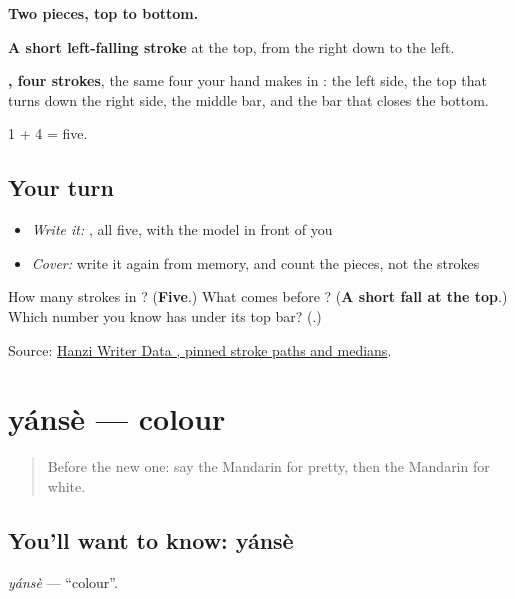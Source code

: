 \begin{quote}
\end{quote}

\textbf{Two pieces, top to bottom.}

\textbf{A short left-falling stroke} at the top, from the right down to the left.

\textbf{, four strokes}, the same four your hand makes in : the left side, the top that turns down the right side, the middle bar, and the bar that closes the bottom.

1 + 4 = five.

\subsection*{Your turn}
\begin{itemize}
\raggedright
  \item \emph{Write it:} , all five, with the model in front of you
  \item \emph{Cover:} write it again from memory, and count the pieces, not the strokes
\end{itemize}

\begin{tcolorbox}[breakable,colback=teal!4,colframe=teal!35!black,title={Before you move on}]
How many strokes in ? (\textbf{Five}.) What comes before ? (\textbf{A short fall at the top}.) Which number you know has  under its top bar? (\textbf{}.)

Source: \href{https://raw.githubusercontent.com/chanind/hanzi-writer-data/68d10a4b21150cae5e1ebbd223eed289cf32d90c/data/\%E7\%99\%BD.json}{Hanzi Writer Data , pinned stroke paths and medians}.
\end{tcolorbox}
\section[yánsè]{yánsè — colour}

\label{lesson:ZH-C60-yanse}



\begin{quote}
Before the new one: say the Mandarin for pretty, then the Mandarin for white.
\end{quote}

\subsection*{You'll want to know: yánsè}
\emph{yánsè} — \textquotedblleft{}colour\textquotedblright{}.

